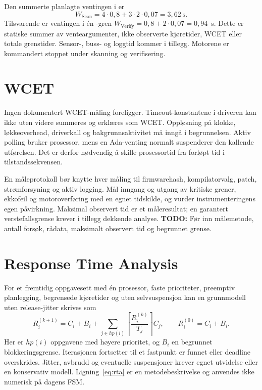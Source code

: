 \documentclass[a4paper,11pt,oneside]{report}
\newcommand{\todo}[1]{\textcolor{todocolor}{\textbf{TODO:} #1}}
\newcommand{\kode}[1]{\begingroup
 \sbox0{\texttt{\detokenize{#1}}}%
 \ifdim\wd0>150pt\relax
  {\urlstyle{tt}\expandafter\nolinkurl\expandafter{\detokenize{#1}}}%
 \else\usebox0\fi\endgroup}
\begin{document}
Den summerte planlagte ventingen i \kode{Scan} er
\begin{equation}
W_{\mathrm{Scan}}=4\cdot0{,}8+3\cdot2\cdot0{,}07=3{,}62\ \mathrm{s}.
\label{eq:scan}
\end{equation}
Tilsvarende er ventingen i én \kode{Verify}-gren
$W_{\mathrm{Verify}}=0{,}8+2\cdot0{,}07=0{,}94$~s.
Dette er statiske summer av venteargumenter, ikke observerte kjøretider,
WCET eller totale grenstider. Sensor-, buss- og loggtid kommer i tillegg.
Motorene er kommandert stoppet under skanning og verifisering.

\section{WCET}
Ingen dokumentert WCET-måling foreligger. Timeout-konstantene i driveren
kan ikke uten videre summeres og erklæres som WCET. Oppløsning på klokke,
løkkeoverhead, driverkall og bakgrunnsaktivitet må inngå i begrunnelsen.
Aktiv polling bruker prosessor, mens en Ada-venting normalt suspenderer
den kallende utførelsen. Det er derfor nødvendig å skille prosessortid fra
forløpt tid i tilstandssekvensen.

En måleprotokoll bør knytte hver måling til firmwarehash, kompilatorvalg,
patch, strømforsyning og aktiv logging. Mål inngang og utgang av kritiske
grener, ekkofeil og motoroverføring med en egnet tidskilde, og vurder
instrumenteringens egen påvirkning. Maksimal observert tid er et måleresultat;
en garantert verstefallsgrense krever i tillegg dekkende analyse.
\todo{Før inn målemetode, antall forsøk, rådata, maksimalt observert tid og begrunnet grense.}

\section{Response Time Analysis}
For et fremtidig oppgavesett med én prosessor, faste prioriteter,
preemptiv planlegging, begrensede kjøretider og uten selvsuspensjon kan
en grunnmodell uten release-jitter skrives som~\cite{rta}
\begin{equation}
R_i^{(k+1)}=C_i+B_i+
\sum_{j\in hp(i)}\left\lceil\frac{R_i^{(k)}}{T_j}\right\rceil C_j,
\qquad R_i^{(0)}=C_i+B_i.
\label{eq:rta}
\end{equation}
Her er $hp(i)$ oppgavene med høyere prioritet, og $B_i$ en begrunnet
blokkeringsgrense. Iterasjonen fortsetter til et fastpunkt er funnet eller
deadline overskrides. Jitter, avbrudd og eventuelle suspensjoner krever
egnet utvidelse eller en konservativ modell. Ligning~\eqref{eq:rta} er en
metodebeskrivelse og anvendes ikke numerisk på dagens FSM.
\end{document}

